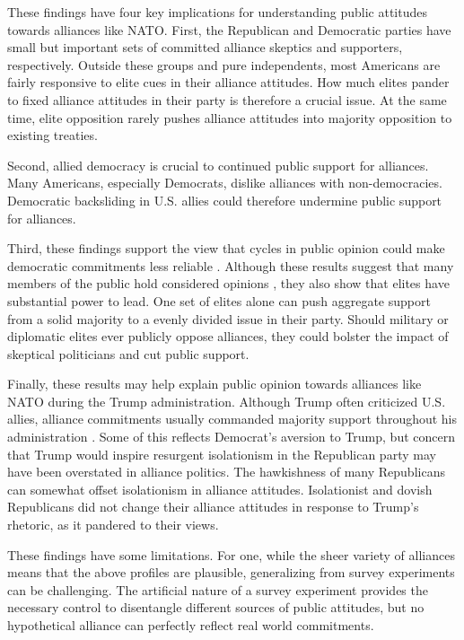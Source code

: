 \documentclass[12pt]{article}
\begin{document}
These findings have four key implications for understanding public attitudes towards alliances like NATO. 
First, the Republican and Democratic parties have small but important sets of committed alliance skeptics and supporters, respectively.
Outside these groups and pure independents, most Americans are fairly responsive to elite cues in their alliance attitudes. 
How much elites pander to fixed alliance attitudes in their party is therefore a crucial issue. 
At the same time, elite opposition rarely pushes alliance attitudes into majority opposition to existing treaties. 


Second, allied democracy is crucial to continued public support for alliances.
Many Americans, especially Democrats, dislike alliances with non-democracies. 
Democratic backsliding in U.S. allies could therefore undermine public support for alliances. 


Third, these findings support the view that cycles in public opinion could make democratic commitments less reliable \citep{GartzkeGleditsch2004}. 
Although these results suggest that many members of the public hold considered opinions \citep{PageShapiro1992}, they also show that elites have substantial power to lead. 
One set of elites alone can push aggregate support from a solid majority to a evenly divided issue in their party.
Should military or diplomatic elites ever publicly oppose alliances, they could bolster the impact of skeptical politicians and cut public support. 


Finally, these results may help explain public opinion towards alliances like NATO during the Trump administration.
Although Trump often criticized U.S. allies, alliance commitments usually commanded majority support throughout his administration \citep{PewNATO2020}. 
Some of this reflects Democrat's aversion to Trump, but concern that Trump would inspire resurgent isolationism in the Republican party may have been overstated in alliance politics. 
The hawkishness of many Republicans can somewhat offset isolationism in alliance attitudes.
Isolationist and dovish Republicans did not change their alliance attitudes in response to Trump's rhetoric, as it pandered to their views. 


These findings have some limitations. 
For one, while the sheer variety of alliances means that the above profiles are plausible, generalizing from survey experiments can be challenging. 
The artificial nature of a survey experiment provides the necessary control to disentangle different sources of public attitudes, but no hypothetical alliance can perfectly reflect real world commitments.
\end{document}
